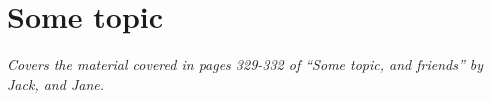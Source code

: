 \documentclass[a4paper,12pt,onecolumn,openany]{book}
\begin{document}


\section{Some topic}
\emph{Covers the material covered in pages 329-332 of ``Some topic, and friends''
by Jack, and Jane.}
\end{document}
